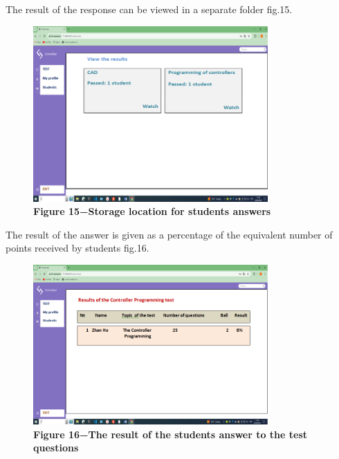 The result of the response can be viewed in a separate folder fig.15.

\begin{figure}[H]
	\centering
	\includegraphics[width=0.8\textwidth]{assets/140}
	\caption*{\bfseries Figure 15−Storage location for students\textquotesingle{}
	answers}
\end{figure}


\begin{multicols}{2}
The result of the answer is given as a percentage of the equivalent
number of points received by students fig.16.
\end{multicols}

\begin{figure}[H]
	\centering
	\includegraphics[width=0.8\textwidth]{assets/141}
	\caption*{\bfseries Figure 16−The result of the student\textquotesingle s answer to
	the test questions}
\end{figure}

